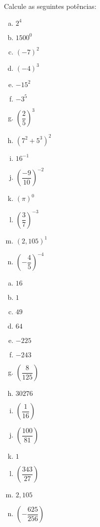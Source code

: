 \begin{secExercicios}
\begin{exer}
Calcule as seguintes potências:
\begin{multicols}{2}
\begin{enumerate}[a)]
\item $2^4$ 
\item $1500^0$
\item $(-7)^2$
\item $(-4)^3$
\item $-15^2$
\item $-3^5$
\item $\left(\dfrac{2}{5}\right)^3$
\item $(7^2 + 5^3)^2$
\item $16^{-1}$
\item $\left(\dfrac{-9}{10}\right)^{-2}$
\item $(\pi)^0$
\item $\left(\dfrac{3}{7}\right)^{-3}$
\item $(2,105)^1$
\item $\left( - \dfrac{4}{5} \right)^{-4}$
\end{enumerate}
\end{multicols}
\end{exer}
\begin{resp}
  \begin{multicols}{3}
\begin{enumerate}[a)]
\item $16$ 
\item $1$
\item $49$
\item $64$
\item $ -225$
\item $-243$
\item $\left(\dfrac{8}{125}\right)$
\item $30276$
\item $\left(\dfrac{1}{16}\right)$
\item $\left(\dfrac{100}{81}\right)$
\item $1$
\item $\left(\dfrac{343}{27}\right)$
\item $2,105$
\item $\left( - \dfrac{625}{256}\right)$
\end{enumerate}
\end{multicols}
\end{resp}



\end{secExercicios}
